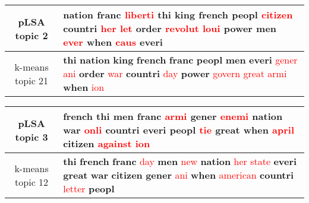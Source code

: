 \begin{center}\begin{tabularx}{\textwidth} {
  | c | >{\raggedright\arraybackslash}X | } \hline 
pLSA topic 2 & \textbf{nation} \textbf{franc} \textcolor{red}{liberti} \textbf{thi} \textbf{king} \textbf{french} \textbf{peopl} \textcolor{red}{citizen} \textbf{countri} \textcolor{red}{her} \textcolor{red}{let} \textbf{order} \textcolor{red}{revolut} \textcolor{red}{loui} \textbf{power} \textbf{men} \textcolor{red}{ever} \textbf{when} \textcolor{red}{caus} \textbf{everi} \\ \hline 
k-means topic 21 & \textbf{thi} \textbf{nation} \textbf{king} \textbf{french} \textbf{franc} \textbf{peopl} \textbf{men} \textbf{everi} \textcolor{red}{gener} \textcolor{red}{ani} \textbf{order} \textcolor{red}{war} \textbf{countri} \textcolor{red}{day} \textbf{power} \textcolor{red}{govern} \textcolor{red}{great} \textcolor{red}{armi} \textbf{when} \textcolor{red}{ion} \\ \hline 
\end{tabularx}

\end{center}

\begin{center}\begin{tabularx}{\textwidth} {
  | c | >{\raggedright\arraybackslash}X | } \hline 
pLSA topic 3 & \textbf{french} \textbf{thi} \textbf{men} \textbf{franc} \textcolor{red}{armi} \textbf{gener} \textcolor{red}{enemi} \textbf{nation} \textbf{war} \textcolor{red}{onli} \textbf{countri} \textbf{everi} \textbf{peopl} \textcolor{red}{tie} \textbf{great} \textbf{when} \textcolor{red}{april} \textbf{citizen} \textcolor{red}{against} \textcolor{red}{ion} \\ \hline 
k-means topic 12 & \textbf{thi} \textbf{french} \textbf{franc} \textcolor{red}{day} \textbf{men} \textcolor{red}{new} \textbf{nation} \textcolor{red}{her} \textcolor{red}{state} \textbf{everi} \textbf{great} \textbf{war} \textbf{citizen} \textbf{gener} \textcolor{red}{ani} \textbf{when} \textcolor{red}{american} \textbf{countri} \textcolor{red}{letter} \textbf{peopl} \\ \hline 
\end{tabularx}

\end{center}

